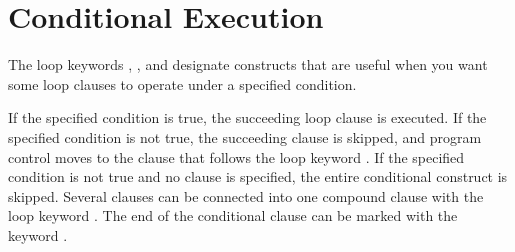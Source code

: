 \section{Conditional Execution}
\label{LOOP-COND-SECTION}

The loop keywords , , and  designate constructs that 
are useful when you want some loop clauses to operate under a specified
condition.

If the specified condition is true, the succeeding loop clause
is executed.  If the specified condition is not true, the succeeding clause is
skipped, and program control moves to the clause that follows the loop
keyword .  If the specified condition is not true and no
 clause is specified, the entire conditional construct
is skipped.  Several clauses can be connected into
one compound clause with the loop keyword .
The end of the conditional clause can be marked with the keyword .

